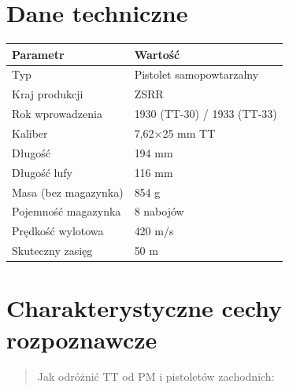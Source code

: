 \documentclass[12pt,openany,oneside]{book}
\begin{document}
\section{Dane techniczne}\label{dane-techniczne-87}

\begin{longtable}[]{@{}ll@{}}
\toprule\noalign{}
Parametr & Wartość \\
\midrule\noalign{}
\endhead
\bottomrule\noalign{}
\endlastfoot
Typ & Pistolet samopowtarzalny \\
Kraj produkcji & ZSRR \\
Rok wprowadzenia & 1930 (TT-30) / 1933 (TT-33) \\
Kaliber & 7,62×25 mm TT \\
Długość & 194 mm \\
Długość lufy & 116 mm \\
Masa (bez magazynka) & 854 g \\
Pojemność magazynka & 8 nabojów \\
Prędkość wylotowa & 420 m/s \\
Skuteczny zasięg & 50 m \\
\end{longtable}

\section{Charakterystyczne cechy
rozpoznawcze}\label{charakterystyczne-cechy-rozpoznawcze-87}

\begin{quote}
Jak odróżnić TT od PM i pistoletów zachodnich:
\end{quote}
\end{document}
